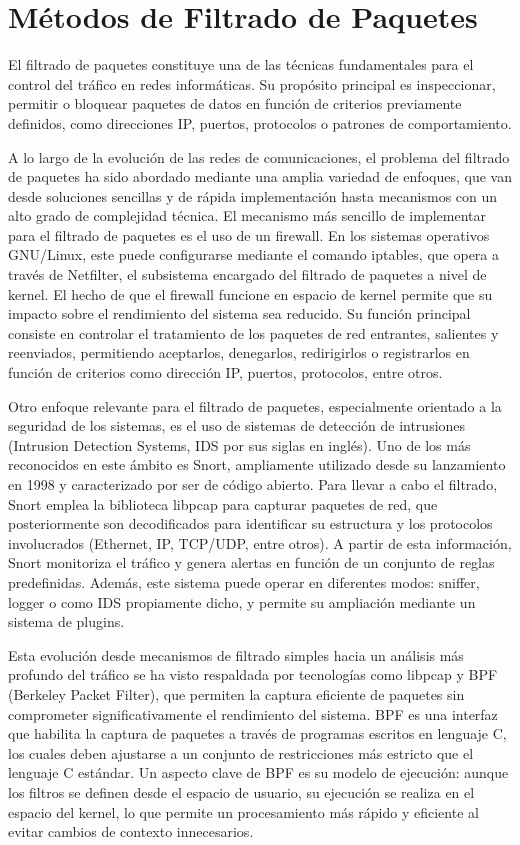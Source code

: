\section{Métodos de Filtrado de Paquetes}
El filtrado de paquetes constituye una de las técnicas fundamentales para el control del tráfico en redes informáticas. Su propósito principal es inspeccionar, permitir o bloquear paquetes de datos en función de criterios previamente definidos, como direcciones IP, puertos, protocolos o patrones de comportamiento. 

A lo largo de la evolución de las redes de comunicaciones, el problema del filtrado de paquetes ha sido abordado mediante una amplia variedad de enfoques, que van desde soluciones sencillas y de rápida implementación hasta mecanismos con un alto grado de complejidad técnica. El mecanismo más sencillo de implementar para el filtrado de paquetes es el uso de un firewall. En los sistemas operativos GNU/Linux, este puede configurarse mediante el comando iptables, que opera a través de Netfilter, el subsistema encargado del filtrado de paquetes a nivel de kernel. El hecho de que el firewall funcione en espacio de kernel permite que su impacto sobre el rendimiento del sistema sea reducido. Su función principal consiste en controlar el tratamiento de los paquetes de red entrantes, salientes y reenviados, permitiendo aceptarlos, denegarlos, redirigirlos o registrarlos en función de criterios como dirección IP, puertos, protocolos, entre otros.\cite{LinuxIptables}

Otro enfoque relevante para el filtrado de paquetes, especialmente orientado a la seguridad de los sistemas, es el uso de sistemas de detección de intrusiones (Intrusion Detection Systems, IDS por sus siglas en inglés). Uno de los más reconocidos en este ámbito es Snort, ampliamente utilizado desde su lanzamiento en 1998 y caracterizado por ser de código abierto\cite{Roesch1999Snort}. Para llevar a cabo el filtrado, Snort emplea la biblioteca libpcap para capturar paquetes de red, que posteriormente son decodificados para identificar su estructura y los protocolos involucrados (Ethernet, IP, TCP/UDP, entre otros). A partir de esta información, Snort monitoriza el tráfico y genera alertas en función de un conjunto de reglas predefinidas. Además, este sistema puede operar en diferentes modos: sniffer, logger o como IDS propiamente dicho, y permite su ampliación mediante un sistema de plugins.

Esta evolución desde mecanismos de filtrado simples hacia un análisis más profundo del tráfico se ha visto respaldada por tecnologías como libpcap y BPF (Berkeley Packet Filter), que permiten la captura eficiente de paquetes sin comprometer significativamente el rendimiento del sistema. BPF es una interfaz que habilita la captura de paquetes a través de programas escritos en lenguaje C, los cuales deben ajustarse a un conjunto de restricciones más estricto que el lenguaje C estándar. Un aspecto clave de BPF es su modelo de ejecución: aunque los filtros se definen desde el espacio de usuario, su ejecución se realiza en el espacio del kernel, lo que permite un procesamiento más rápido y eficiente al evitar cambios de contexto innecesarios\cite{FreeBSDBPF}.

